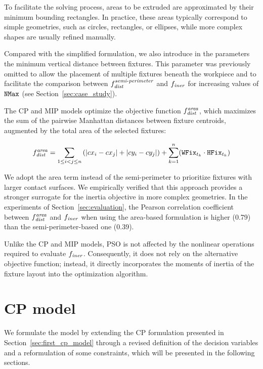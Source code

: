 To facilitate the solving process, areas to be extruded are approximated by their minimum bounding rectangles. In practice, these areas typically correspond to simple geometries, such as circles, rectangles, or ellipses, while more complex shapes are usually refined manually.

Compared with the simplified formulation, we also introduce in the parameters the minimum vertical distance between fixtures. This parameter was previously omitted to allow the placement of multiple fixtures beneath the workpiece and to facilitate the comparison between $f_{\mathit{dist}}^{\mathit{semi\text{-}perimeter}}$ and $f_\mathit{iner}$ for increasing values of $\mathtt{NMax}$ (see Section~\ref{sec:case_study}).

The CP and MIP models optimize the objective function $f_{\mathit{dist}}^{\mathit{area}}$, which maximizes the sum of the pairwise Manhattan distances between fixture centroids, augmented by the total area of the selected fixtures:

\begin{equation}
	f_{\mathit{dist}}^{\mathit{area}} = \sum_{1 \le i < j \le n} \left(|cx_i - cx_j| + |cy_i - cy_j|\right) + \sum_{k=1}^{n} (\mathtt{WFix}_{t_k} \cdot \mathtt{HFix}_{t_k})
	\label{eq:f_dist_area}
\end{equation}

We adopt the area term instead of the semi-perimeter to prioritize fixtures with larger contact surfaces. We empirically verified that this approach provides a stronger surrogate for the inertia objective in more complex geometries. In the experiments of Section~\ref{sec:evaluation}, the Pearson correlation  coefficient~\cite{benesty2009pearson} between $f_{\mathit{dist}}^{\mathit{area}}$ and $f_\mathit{iner}$ when using the area-based formulation is higher (0.79) than the semi-perimeter-based one (0.39).

Unlike the CP and MIP models, PSO is not affected by the nonlinear operations required to evaluate $f_\mathit{iner}$. Consequently, it does not rely on the alternative objective function; instead, it directly incorporates the moments of inertia of the fixture layout into the optimization algorithm.

\section{CP model}
\label{sec:cp_model}

We formulate the model by extending the CP formulation presented in Section~\ref{sec:first_cp_model} through a revised definition of the decision variables and a reformulation of some constraints, which will be presented in the following sections. 

